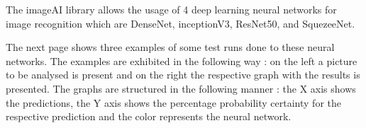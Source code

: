   The imageAI library allows the usage of 4 deep learning neural networks for image recognition which are DenseNet, inceptionV3, ResNet50, and SquezeeNet.

  The next page shows three examples of some test runs done to these neural networks. The examples are exhibited in the following way : on the left a  picture to be analysed is present and on the right the respective graph with the results is presented. The graphs are structured in the following manner : the X axis shows the predictions, the Y axis shows the percentage probability certainty for the respective prediction and the color represents the neural network.





\newpage



